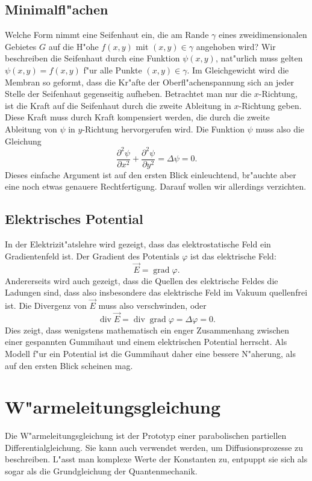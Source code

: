 \subsection{Minimalfl"achen\label{beispiele:minimalflaechen}}
Welche Form nimmt eine Seifenhaut ein, die am Rande $\gamma$ eines
zweidimensionalen Gebietes $G$ auf die H"ohe $f(x,y)$ mit $(x,y)\in \gamma$
angehoben wird? Wir beschreiben die Seifenhaut durch eine Funktion
$\psi(x,y)$, nat"urlich muss gelten $\psi(x,y)=f(x,y)$ f"ur alle
Punkte $(x,y)\in\gamma$.
Im Gleichgewicht wird die Membran so geformt, dass die Kr"afte
der Oberfl"achenspannung sich an jeder Stelle der Seifenhaut gegenseitig
aufheben. Betrachtet man nur die $x$-Richtung, ist die Kraft auf die
Seifenhaut durch die zweite Ableitung in $x$-Richtung geben.
Diese Kraft muss durch Kraft kompensiert werden, die durch die
zweite Ableitung von $\psi$ in $y$-Richtung hervorgerufen wird.
Die Funktion $\psi$ muss also die Gleichung
\[
\frac{\partial^2\psi}{\partial x^2}+\frac{\partial^2\psi}{\partial y^2}
=\Delta\psi=0.
\]
Dieses einfache Argument ist auf den ersten Blick einleuchtend, br"auchte
aber eine noch etwas genauere Rechtfertigung. Darauf wollen wir allerdings
verzichten.

\subsection{Elektrisches Potential\label{beispiele:elektrischespotential}}
In der Elektrizit"atslehre wird gezeigt, dass das elektrostatische Feld 
ein Gradientenfeld ist. Der Gradient des Potentials $\varphi$  ist das
elektrische Feld:
\[
\vec E=\operatorname{grad}\varphi.
\]
Andererseits wird auch gezeigt, dass die Quellen des elektrische Feldes die
Ladungen sind, dass also insbesondere das elektrische Feld im Vakuum quellenfrei ist.
Die Divergenz von $\vec E$ muss also verschwinden, oder
\[
\operatorname{div}\vec E=\operatorname{div}\operatorname{grad}\varphi
=\Delta \varphi=0.
\]
Dies zeigt, dass wenigstens mathematisch ein enger Zusammenhang zwischen
einer gespannten Gummihaut und einem elektrischen Potential herrscht.
Als Modell f"ur ein Potential ist die Gummihaut daher eine bessere
N"aherung, als auf den ersten Blick scheinen mag.

\section{W"armeleitungsgleichung\label{beispiele:waermeleitung}}
Die W"armeleitungsgleichung ist der Prototyp einer parabolischen partiellen
Differentialgleichung. Sie kann auch verwendet werden, um Diffusionsprozesse
zu beschreiben. L"asst man komplexe Werte der Konstanten zu, entpuppt
sie sich als sogar als die Grundgleichung der Quantenmechanik.

